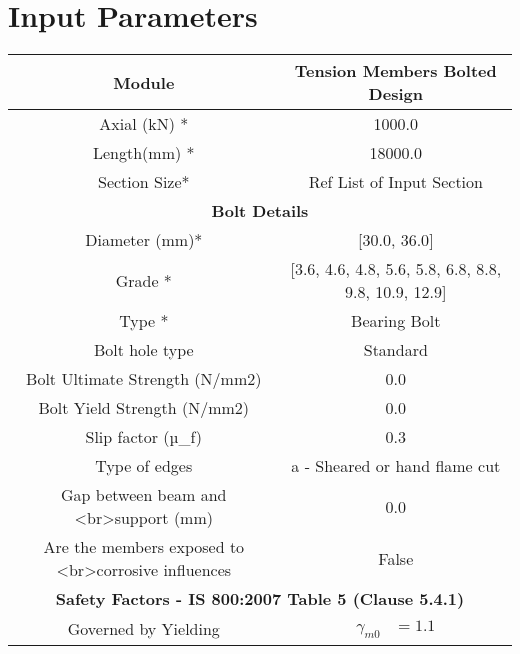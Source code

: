 \documentclass{article}%
\begin{document}
%
\normalsize%
\pagestyle{header}%
\section{Input Parameters}%
\label{sec:InputParameters}%
\renewcommand{\arraystretch}{1.2}%
\begin{longtable}{|p{5cm}|p{2cm}|p{2cm}|p{2cm}|p{5cm}|}%
\hline%
\hline%
\multicolumn{3}{|c|}{Module}&\multicolumn{2}{|c|}{Tension Members Bolted Design}\\%
\hline%
\hline%
\multicolumn{3}{|c|}{Axial (kN) *}&\multicolumn{2}{|c|}{1000.0}\\%
\hline%
\hline%
\multicolumn{3}{|c|}{Length(mm) *}&\multicolumn{2}{|c|}{18000.0}\\%
\hline%
\hline%
\multicolumn{3}{|c|}{Section Size*}&\multicolumn{2}{|c|}{Ref List of Input Section}\\%
\hline%
\hline%
\multicolumn{5}{|c|}{\textbf{Bolt Details}}\\%
\hline%
\hline%
\multicolumn{3}{|c|}{Diameter (mm)*}&\multicolumn{2}{|c|}{{[}30.0, 36.0{]}}\\%
\hline%
\hline%
\multicolumn{3}{|c|}{Grade *}&\multicolumn{2}{|c|}{{[}3.6, 4.6, 4.8, 5.6, 5.8, 6.8, 8.8, 9.8, 10.9, 12.9{]}}\\%
\hline%
\hline%
\multicolumn{3}{|c|}{Type *}&\multicolumn{2}{|c|}{Bearing Bolt}\\%
\hline%
\hline%
\multicolumn{3}{|c|}{Bolt hole type}&\multicolumn{2}{|c|}{Standard}\\%
\hline%
\hline%
\multicolumn{3}{|c|}{Bolt Ultimate Strength (N/mm2)}&\multicolumn{2}{|c|}{0.0}\\%
\hline%
\hline%
\multicolumn{3}{|c|}{Bolt Yield Strength (N/mm2)}&\multicolumn{2}{|c|}{0.0}\\%
\hline%
\hline%
\multicolumn{3}{|c|}{Slip factor (µ\_f)}&\multicolumn{2}{|c|}{0.3}\\%
\hline%
\hline%
\multicolumn{3}{|c|}{Type of edges}&\multicolumn{2}{|c|}{a {-} Sheared or hand flame cut}\\%
\hline%
\hline%
\multicolumn{3}{|c|}{Gap between beam and <br>support (mm)}&\multicolumn{2}{|c|}{0.0}\\%
\hline%
\hline%
\multicolumn{3}{|c|}{Are the members exposed to <br>corrosive influences}&\multicolumn{2}{|c|}{False}\\%
\hline%
\hline%
\multicolumn{5}{|c|}{\textbf{Safety Factors {-} IS 800:2007 Table 5 (Clause 5.4.1) }}\\%
\hline%
\hline%
\multicolumn{3}{|c|}{Governed by Yielding}&\multicolumn{2}{|c|}{$\begin{aligned}\gamma_{m0}&=1.1\end{aligned}$}\\%

\end{longtable}
\end{document}
